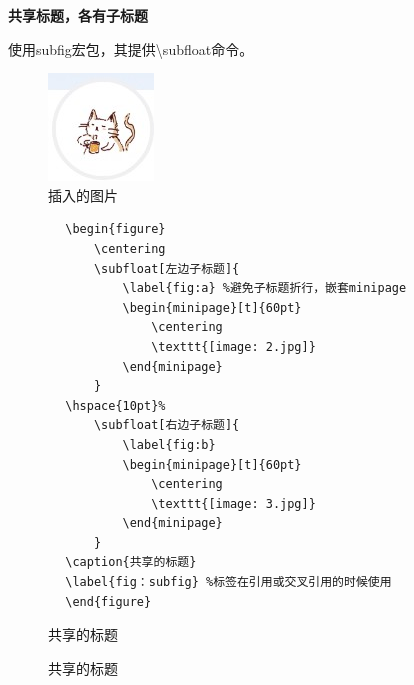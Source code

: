 \documentclass[16pt]{article}
\begin{document}
\textbf{共享标题，各有子标题} \par
    使用subfig宏包，其提供\textbackslash subfloat命令。
    \begin{figure}[htbp]
        \centering
        \includegraphics{image/1.jpg}
        \caption{插入的图片}
    \end{figure}

        \begin{lstlisting}
        \begin{figure}
            \centering
            \subfloat[左边子标题]{
                \label{fig:a} %避免子标题折行，嵌套minipage
                \begin{minipage}[t]{60pt}
                    \centering
                    \texttt{[image: 2.jpg]}    
                \end{minipage}
            }
        \hspace{10pt}%
            \subfloat[右边子标题]{
                \label{fig:b}
                \begin{minipage}[t]{60pt}
                    \centering
                    \texttt{[image: 3.jpg]}    
                \end{minipage}
            }
        \caption{共享的标题}
        \label{fig：subfig} %标签在引用或交叉引用的时候使用
        \end{figure}   
    \end{lstlisting}

    \begin{figure}[htbp]
        \centering
    \hspace{10pt}%
    \caption{共享的标题}
    \label{fig：subfig1}
    \end{figure} 

    \begin{figure}
        \centering
    \hspace{10pt}%
    \caption{共享的标题}
    \label{fig：subfig2} %
    \end{figure}   
\end{document}
